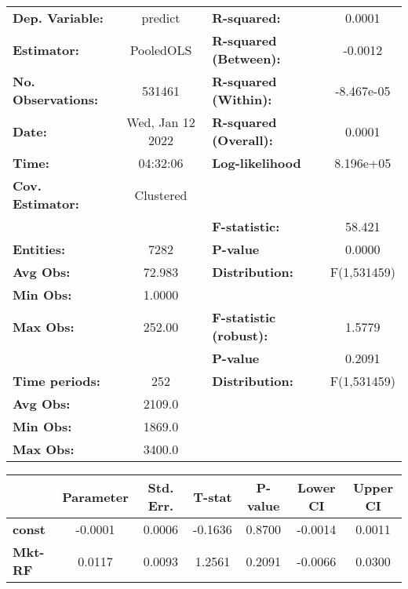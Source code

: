 \begin{center}
\begin{tabular}{lclc}
\toprule
\textbf{Dep. Variable:}    &      predict       & \textbf{  R-squared:         }   &      0.0001      \\
\textbf{Estimator:}        &     PooledOLS      & \textbf{  R-squared (Between):}  &     -0.0012      \\
\textbf{No. Observations:} &       531461       & \textbf{  R-squared (Within):}   &    -8.467e-05    \\
\textbf{Date:}             &  Wed, Jan 12 2022  & \textbf{  R-squared (Overall):}  &      0.0001      \\
\textbf{Time:}             &      04:32:06      & \textbf{  Log-likelihood     }   &    8.196e+05     \\
\textbf{Cov. Estimator:}   &     Clustered      & \textbf{                     }   &                  \\
\textbf{}                  &                    & \textbf{  F-statistic:       }   &      58.421      \\
\textbf{Entities:}         &        7282        & \textbf{  P-value            }   &      0.0000      \\
\textbf{Avg Obs:}          &       72.983       & \textbf{  Distribution:      }   &   F(1,531459)    \\
\textbf{Min Obs:}          &       1.0000       & \textbf{                     }   &                  \\
\textbf{Max Obs:}          &       252.00       & \textbf{  F-statistic (robust):} &      1.5779      \\
\textbf{}                  &                    & \textbf{  P-value            }   &      0.2091      \\
\textbf{Time periods:}     &        252         & \textbf{  Distribution:      }   &   F(1,531459)    \\
\textbf{Avg Obs:}          &       2109.0       & \textbf{                     }   &                  \\
\textbf{Min Obs:}          &       1869.0       & \textbf{                     }   &                  \\
\textbf{Max Obs:}          &       3400.0       & \textbf{                     }   &                  \\
\bottomrule
\end{tabular}
\begin{tabular}{lcccccc}
                & \textbf{Parameter} & \textbf{Std. Err.} & \textbf{T-stat} & \textbf{P-value} & \textbf{Lower CI} & \textbf{Upper CI}  \\
\midrule
\textbf{const}  &      -0.0001       &       0.0006       &     -0.1636     &      0.8700      &      -0.0014      &       0.0011       \\
\textbf{Mkt-RF} &       0.0117       &       0.0093       &      1.2561     &      0.2091      &      -0.0066      &       0.0300       \\
\bottomrule
\end{tabular}
\end{center}
